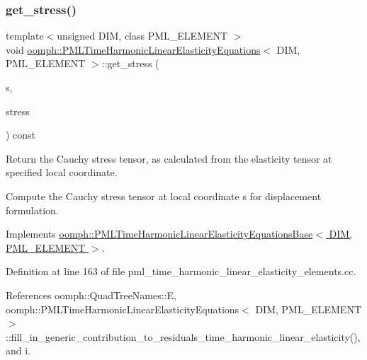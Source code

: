 \mbox{\label{classoomph_1_1PMLTimeHarmonicLinearElasticityEquations_a81f0d12fb13d9fe3d1daab709b3bd012}} 
\subsubsection{\texorpdfstring{get\+\_\+stress()}{get\_stress()}}
{\footnotesize\ttfamily template$<$unsigned D\+IM, class P\+M\+L\+\_\+\+E\+L\+E\+M\+E\+NT $>$ \\
void \hyperlink{classoomph_1_1PMLTimeHarmonicLinearElasticityEquations}{oomph\+::\+P\+M\+L\+Time\+Harmonic\+Linear\+Elasticity\+Equations}$<$ D\+IM, P\+M\+L\+\_\+\+E\+L\+E\+M\+E\+NT $>$\+::get\+\_\+stress (\begin{DoxyParamCaption}\item[{const \hyperlink{classoomph_1_1Vector}{Vector}$<$ double $>$ \&}]{s,  }\item[{\hyperlink{classoomph_1_1DenseMatrix}{Dense\+Matrix}$<$ std\+::complex$<$ double $>$ $>$ \&}]{stress }\end{DoxyParamCaption}) const\hspace{0.3cm}{\ttfamily [virtual]}}



Return the Cauchy stress tensor, as calculated from the elasticity tensor at specified local coordinate. 

Compute the Cauchy stress tensor at local coordinate s for displacement formulation. 

Implements \hyperlink{classoomph_1_1PMLTimeHarmonicLinearElasticityEquationsBase_aed04505f397800718225e3d6c1bbee80}{oomph\+::\+P\+M\+L\+Time\+Harmonic\+Linear\+Elasticity\+Equations\+Base$<$ D\+I\+M, P\+M\+L\+\_\+\+E\+L\+E\+M\+E\+N\+T $>$}.



Definition at line 163 of file pml\+\_\+time\+\_\+harmonic\+\_\+linear\+\_\+elasticity\+\_\+elements.\+cc.



References oomph\+::\+Quad\+Tree\+Names\+::E, oomph\+::\+P\+M\+L\+Time\+Harmonic\+Linear\+Elasticity\+Equations$<$ D\+I\+M, P\+M\+L\+\_\+\+E\+L\+E\+M\+E\+N\+T $>$\+::fill\+\_\+in\+\_\+generic\+\_\+contribution\+\_\+to\+\_\+residuals\+\_\+time\+\_\+harmonic\+\_\+linear\+\_\+elasticity(), and i.




